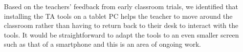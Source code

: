 
Based on the teachers' feedback from early classroom trials, we
identified that installing the TA tools on a tablet PC 
helps the teacher to move around the classroom rather than
having to return back to their desk to interact with the tools.
It would be straightforward to adapt the tools to an even smaller screen such
as that of a smartphone and this is an area of ongoing work.


